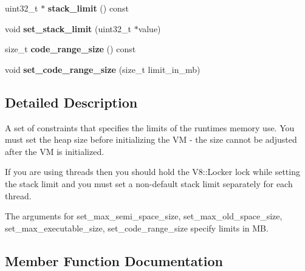 \begin{DoxyCompactItemize}
\item 
uint32\+\_\+t $\ast$ {\bfseries stack\+\_\+limit} () const \hypertarget{classv8_1_1ResourceConstraints_aafc4a94f2eeb0684e7a50f355eb4d06d}{}\label{classv8_1_1ResourceConstraints_aafc4a94f2eeb0684e7a50f355eb4d06d}

\item 
void {\bfseries set\+\_\+stack\+\_\+limit} (uint32\+\_\+t $\ast$value)\hypertarget{classv8_1_1ResourceConstraints_a26ed3e89985a4afe34e84509fb093cf1}{}\label{classv8_1_1ResourceConstraints_a26ed3e89985a4afe34e84509fb093cf1}

\item 
size\+\_\+t {\bfseries code\+\_\+range\+\_\+size} () const \hypertarget{classv8_1_1ResourceConstraints_a8dd511917ad17bf2185d574b0c7e4186}{}\label{classv8_1_1ResourceConstraints_a8dd511917ad17bf2185d574b0c7e4186}

\item 
void {\bfseries set\+\_\+code\+\_\+range\+\_\+size} (size\+\_\+t limit\+\_\+in\+\_\+mb)\hypertarget{classv8_1_1ResourceConstraints_adeab824b969292881098b66164ab9e13}{}\label{classv8_1_1ResourceConstraints_adeab824b969292881098b66164ab9e13}

\end{DoxyCompactItemize}


\subsection{Detailed Description}
A set of constraints that specifies the limits of the runtime\textquotesingle{}s memory use. You must set the heap size before initializing the VM -\/ the size cannot be adjusted after the VM is initialized.

If you are using threads then you should hold the V8\+::\+Locker lock while setting the stack limit and you must set a non-\/default stack limit separately for each thread.

The arguments for set\+\_\+max\+\_\+semi\+\_\+space\+\_\+size, set\+\_\+max\+\_\+old\+\_\+space\+\_\+size, set\+\_\+max\+\_\+executable\+\_\+size, set\+\_\+code\+\_\+range\+\_\+size specify limits in MB. 

\subsection{Member Function Documentation}
